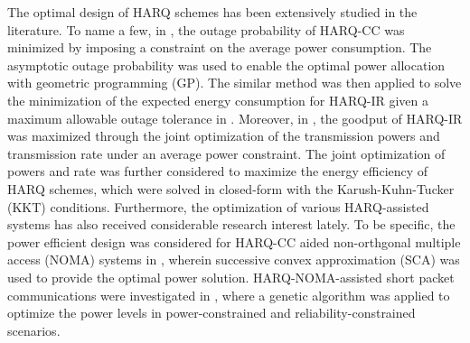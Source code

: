\documentclass[conference]{IEEEtran}
\begin{document}





The optimal design of HARQ schemes has been extensively studied in the literature. To name a few, in \cite{6697940}, the outage probability of HARQ-CC was minimized by imposing a constraint on the average power consumption. The asymptotic outage probability was used to enable the optimal power allocation with geometric programming (GP). The similar method was then applied to solve the minimization of the expected energy consumption for HARQ-IR given a maximum allowable outage tolerance in \cite{9473556}. Moreover, in \cite{8362650}, the goodput of HARQ-IR was maximized through the joint optimization of the transmission powers and transmission rate under an average power constraint. The joint optimization of powers and rate was further considered to maximize the energy efficiency of HARQ schemes, which were solved in closed-form with the Karush-Kuhn-Tucker (KKT) conditions. Furthermore, the optimization of various HARQ-assisted systems has also received considerable research interest lately. To be specific, the power efficient design was considered for HARQ-CC aided non-orthgonal multiple access (NOMA) systems in \cite{9089002}, wherein successive convex approximation (SCA) was used to provide the optimal power solution. HARQ-NOMA-assisted short packet communications were investigated in \cite{9211722}, where a genetic algorithm was applied to optimize the power levels in power-constrained and reliability-constrained scenarios. %
\end{document}
